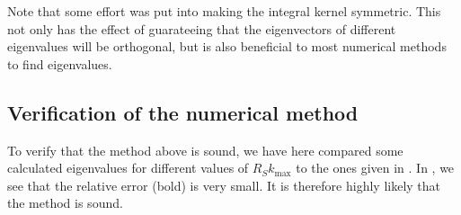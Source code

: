 \documentclass[11pt,a4paper, 
swedish,english %
]{article}
\begin{document}
Note that some effort was put into making the integral
kernel symmetric. This not only has the effect of guarateeing that the
eigenvectors of different eigenvalues will be orthogonal, but is also
beneficial to most numerical methods to find eigenvalues. 





\subsection{Verification of the numerical method}
To verify that the method above is sound, we have here compared some calculated eigenvalues for different values of $R_Sk_{\max}$ to the ones given in \cite{PSWF-IV_1964}. In , we see that the relative error (bold) is very small. It is therefore highly likely that the method is sound.
\end{document}
